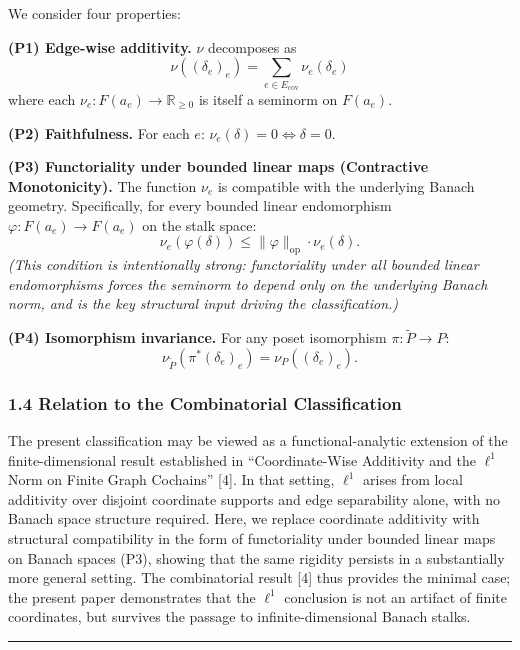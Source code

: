 \documentclass[
]{article}
\begin{document}
We consider four properties:

\textbf{(P1) Edge-wise additivity.} \(\nu\) decomposes as
\[\nu((\delta_e)_e) = \sum_{e \in E_{\text{cov}}} \nu_e(\delta_e)\]
where each \(\nu_e: F(a_e) \to \mathbb{R}_{\geq 0}\) is itself a
seminorm on \(F(a_e)\).

\textbf{(P2) Faithfulness.} For each \(e\):
\(\nu_e(\delta) = 0 \iff \delta = 0\).

\textbf{(P3) Functoriality under bounded linear maps (Contractive
Monotonicity).} The function \(\nu_e\) is compatible with the underlying
Banach geometry. Specifically, for every bounded linear endomorphism
\(\varphi: F(a_e) \to F(a_e)\) on the stalk space:
\[\nu_e(\varphi(\delta)) \leq \|\varphi\|_{\text{op}} \cdot \nu_e(\delta).\]
\emph{(This condition is intentionally strong: functoriality under all
bounded linear endomorphisms forces the seminorm to depend only on the
underlying Banach norm, and is the key structural input driving the
classification.)}

\textbf{(P4) Isomorphism invariance.} For any poset isomorphism
\(\pi: \tilde{P} \to P\):
\[\nu_{\tilde{P}}(\pi^*(\delta_e)_e) = \nu_P((\delta_e)_e).\]

\subsubsection{1.4 Relation to the Combinatorial
Classification}\label{relation-to-the-combinatorial-classification}

The present classification may be viewed as a functional-analytic
extension of the finite-dimensional result established in
``Coordinate-Wise Additivity and the \(\ell^1\) Norm on Finite Graph
Cochains'' {[}4{]}. In that setting, \(\ell^1\) arises from local
additivity over disjoint coordinate supports and edge separability
alone, with no Banach space structure required. Here, we replace
coordinate additivity with structural compatibility in the form of
functoriality under bounded linear maps on Banach spaces (P3), showing
that the same rigidity persists in a substantially more general setting.
The combinatorial result {[}4{]} thus provides the minimal case; the
present paper demonstrates that the \(\ell^1\) conclusion is not an
artifact of finite coordinates, but survives the passage to
infinite-dimensional Banach stalks.

\begin{center}\rule{0.5\linewidth}{0.5pt}\end{center}
\end{document}
